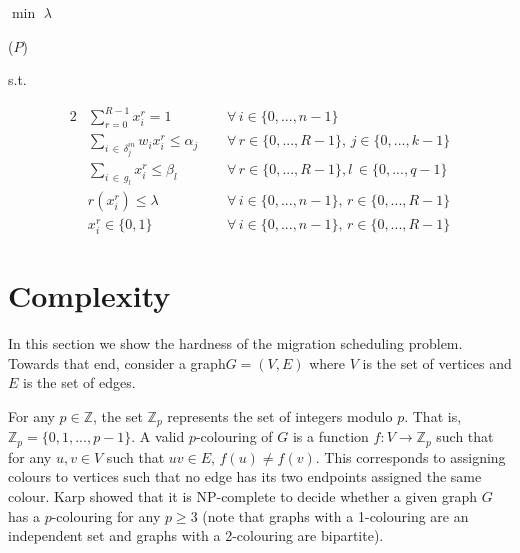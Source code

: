 \documentclass[conference]{IEEEtran}
\begin{document}
\begin{minipage}{0.4\textwidth}
\begin{center}
    $\min$ $\lambda$
\end{center}
\end{minipage}
\begin{minipage}{0.05\textwidth}
\begin{center}
    ($P$)
\end{center}
\end{minipage}
s.t.
\begin{center}
    \begin{alignat*}{2}
        &\sum_{r=0}^{R-1} x^{r}_{i} = 1 \hspace{1cm} &&\forall \, i \in \{0, ..., n-1\} \\
        &\sum_{i \, \in \, \delta^{in}_{j}} w_{i}x^{r}_{i} \leq \alpha_{j} &&\forall \, r \in \{0, ..., R-1\}, \, j \in \{0, ..., k-1\}\\
        &\sum_{i \, \in \, g_{l}} x^{r}_{i} \leq \beta_{l} &&\forall \, r \in \{0, ..., R-1\}, l\,  \in \{0, ..., q-1\}\\
        &r(x^{r}_{i}) \leq \lambda &&\forall \, i \in \{0, ..., n - 1\}, \, r \in \{0, ..., R - 1\}\\
        &x^{r}_{i} \in \{0, 1\} &&\forall \, i \in \{0, ..., n - 1\}, \, r \in \{0, ..., R - 1\}
    \end{alignat*}
\end{center}

\vskip 0.5cm

\section{Complexity}
In this section we show the hardness of the migration scheduling problem. Towards that end, consider a graph\newline $G=(V, E)$ where $V$ is the set of vertices and $E$ is the set of edges. 

For any $p \in \mathbb{Z}$, the set $\mathbb{Z}_{p}$ represents the set of integers modulo $p$. That is, $\mathbb{Z}_{p} = \{0, 1, ..., p - 1\}$. A valid $p$-colouring of $G$ is a function $f: V \rightarrow \mathbb{Z}_{p}$ such that for any $u, v \in V$ such that $uv \in E$, $f(u) \neq f(v)$. This corresponds to assigning colours to vertices such that no edge has its two endpoints assigned the same colour. Karp \cite{karp1972reducibility} showed that it is NP-complete to decide whether a given graph $G$ has a $p$-colouring for any $p \geq 3$ (note that graphs with a 1-colouring are an independent set and graphs with a 2-colouring are bipartite).
\end{document}
